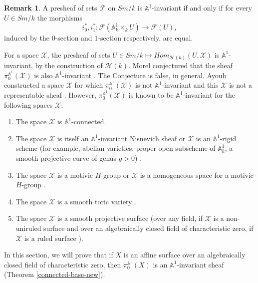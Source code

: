 \documentclass[11pt, reqno]{amsart}
\theoremstyle{plain}
\theoremstyle{definition}
\newtheorem{remark}[thm]{Remark}
\newcommand{\sF}{{\mathcal F}}
\newcommand{\sH}{{\mathcal H}}
\newcommand{\sX}{{\mathcal X}}
\newcommand{\A}{{\mathbb A}}
\begin{document}
\begin{remark} \cite[Lemma 2.16]{mazza} \label{mazza}
A presheaf of sets $\sF$  on $Sm/k$ is $\A^1$-invariant if and only if for every $U \in Sm/k$ the morphisms 
$$i_0^*, i_1^*: \sF(\A^1_k \times_k U) \to \sF(U),$$
induced by the $0$-section and $1$-section respectively, are equal.
\end{remark}
For a space $\sX$, the presheaf of sets $U \in Sm/k \mapsto Hom_{\sH(k)}(U, \sX)$ is $\A^1$-invariant, by the construction of $\sH(k)$. Morel conjectured that the sheaf $\pi_0^{\A^1}(\sX)$ is also $\A^1$-invariant \cite[Conjecture 1.12]{mor}. The Conjecture is false, in general. Ayoub constructed a space $\sX$ for which $\pi_0^{\A^1}(\sX)$ is not $\A^1$-invariant and this $\sX$ is not a representable sheaf \cite[Construction 8]{ayoub}.
However, $\pi_0^{\A^1}(\sX)$ is known to be $\A^1$-invariant for the following spaces $\sX$:
\begin{enumerate}
\item The space $\sX$ is $\A^1$-connected. 
\item The space $\sX$ is itself an $\A^1$-invariant Nisnevich sheaf or $\sX$ is an $\A^1$-rigid scheme (for example, abelian varieties, proper open subscheme of $\A^1_k$, a smooth projective curve of genus $g>0$) \cite[Example 2.1.10]{am}.
\item The space $\sX$ is a motivic $H$-group or $\sX$ is a homogeneous space for a motivic $H$-group \cite[Theorem 4.18]{u}.
\item The space $\sX$ is a smooth toric variety \cite[Lemma 4.2, Lemma 4.4]{w}.
\item The space $\sX$ is a smooth projective surface (over any field, if $\sX$ is a non-uniruled surface \cite[Corollary 3.15]{bhs} and over an algebraically closed field of characteristic zero, if $\sX$ is a ruled surface \cite[Theorem 1.2]{bs}).
\end{enumerate}

In this section, we will prove that if $X$ is an affine surface over an algebraically closed field of characteristic zero, then $\pi_0^{\A^1}(X)$ is an $\A^1$-invariant sheaf (Theorem \ref{connected-base-new}).
\end{document}
